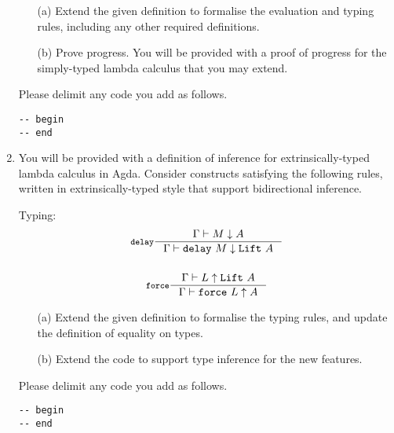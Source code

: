 \documentclass{examhons2018}
\begin{document}
\begin{enumerate}
\begin{enumerate}
\item[(a)] Extend the given definition to formalise the evaluation and
  typing rules, including any other required definitions.

\item[(b)] Prove progress. You will be provided with a proof of
  progress for the simply-typed lambda calculus that you may
  extend.
\end{enumerate}

Please delimit any code you add as follows.
\begin{verbatim}
-- begin
-- end
\end{verbatim}

\newpage

\item \rubricqC

\newcommand{\Lift}{\texttt{Lift}}
\newcommand{\delay}{\texttt{delay}}
\newcommand{\force}{\texttt{force}}
\newcommand{\up}{\uparrow}
\newcommand{\dn}{\downarrow}

You will be provided with a definition of inference for extrinsically-typed lambda
calculus in Agda. Consider constructs satisfying the following rules,
written in extrinsically-typed style that support bidirectional inference.

Typing:
\begin{gather*}
\inference[$\delay$]
  {\Gamma \vdash M \dn A}
  {\Gamma \vdash \delay~M \dn \Lift~A}
\\~\\
\inference[$\force$]
  {\Gamma \vdash L \up \Lift~A}
  {\Gamma \vdash \force~L \up A} 
\end{gather*}

\begin{enumerate}
\item[(a)] Extend the given definition to formalise the typing rules,
and update the definition of equality on types.

\item[(b)] Extend the code to support type inference for the new features.
\end{enumerate}

Please delimit any code you add as follows.
\begin{verbatim}
-- begin
-- end
\end{verbatim}

\end{enumerate}

%
%
\end{document}
